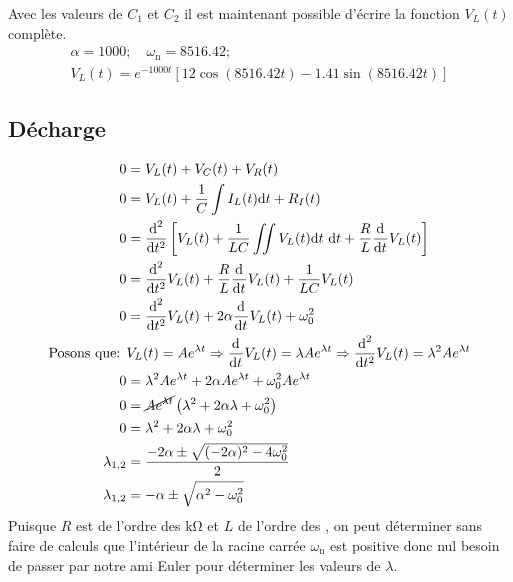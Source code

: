 \documentclass[a11paper, 11pt]{article}
\newcommand{\dt}{\mathrm{d}t}
\newcommand{\ddt}[1]{\frac{\text{d}^{#1}}{\text{d}t^{#1}}}
\newcommand{\vlt}{V_L(t)}
\newcommand{\ilt}{I_L(t)}
\newcommand{\al}{\alpha}
\newcommand{\la}{\lambda}
\newcommand{\ws}{\omega_{0}^2}
\newcommand{\wn}{\omega_{\mathrm{n}}}
\begin{document}
\begin{appendix}
	Avec les valeurs de $C_1$ et $C_2$ il est maintenant possible d'écrire la fonction $\vlt$ complète.
	\begin{gather}
		\al = 1000;\quad \wn = 8516.42; \\
		\vlt = e^{-1000t}\left[12\cos(8516.42 t) - 1.41\sin(8516.42 t)\right]
	\end{gather}



	\subsection{Décharge}
	\begin{gather*}
		\begin{align}
			0                             & = \vlt + V_C(t) + V_R(t)                                                              \\
			\label{eq:rlc_decharge_initial}
			0                             & = \vlt+\frac{1}{C}\int \ilt\dt + R_I(t)                                               \\
			0                             & = \ddt{2}\left[ \vlt + \frac{1}{LC}\iint\vlt\dt\ \dt + \frac{R}{L}\ddt{} \vlt \right] \\
			0                             & = \ddt{2}\vlt+ \frac{R}{L}\ddt{}\vlt +\frac{1}{LC}\vlt                                \\
			0                             & = \ddt{2}\vlt+2\al\ddt{}\vlt+\ws                                                      \\
			\nonumber \text{Posons que: } &
			\vlt=Ae^{\la t} \Rightarrow
			\ddt{}\vlt=\la Ae^{\la t} \Rightarrow
			\ddt{2}\vlt=\la^{2}Ae^{\la t}                                                                                         \\
			0                             & = \la^2Ae^{\la t} +2\al Ae^{\la t} + \ws Ae^{\la t}                                   \\
			0                             & = \cancel{Ae^{\la t}} \left(\la^2 +2\al\la+\ws \right)                                \\
			0                             & = \la^2 +2\al\la+\ws                                                                  \\
			\la_{1,2}                     & = \frac{-2\al\pm\sqrt{(-2\al)^2-4\ws}}{2}                                             \\
			\la_{1,2}                     & = -\al\pm\sqrt{\al^2-\ws}
		\end{align}
	\end{gather*}
	Puisque $R$ est de l'ordre des \si{\kohm} et $L$ de l'ordre des \SI{}{\mH}, on peut déterminer
	sans faire de calculs que l'intérieur de la racine carrée $\wn$ est positive donc nul besoin de
	passer par notre ami Euler pour déterminer les valeurs de $\la$.


\end{appendix}
\end{document}
